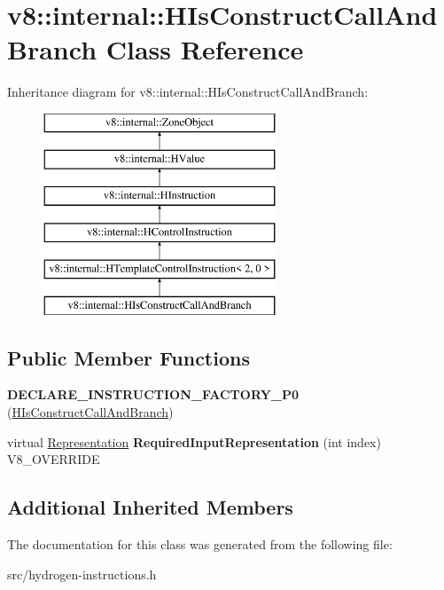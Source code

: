 \hypertarget{classv8_1_1internal_1_1_h_is_construct_call_and_branch}{}\section{v8\+:\+:internal\+:\+:H\+Is\+Construct\+Call\+And\+Branch Class Reference}
\label{classv8_1_1internal_1_1_h_is_construct_call_and_branch}
Inheritance diagram for v8\+:\+:internal\+:\+:H\+Is\+Construct\+Call\+And\+Branch\+:\begin{figure}[H]
\begin{center}
\leavevmode
\includegraphics[height=6.000000cm]{classv8_1_1internal_1_1_h_is_construct_call_and_branch}
\end{center}
\end{figure}
\subsection*{Public Member Functions}
\begin{DoxyCompactItemize}
\item 
\hypertarget{classv8_1_1internal_1_1_h_is_construct_call_and_branch_aeeb16aba89e0bfc5cfa10a5fbc4d72e8}{}{\bfseries D\+E\+C\+L\+A\+R\+E\+\_\+\+I\+N\+S\+T\+R\+U\+C\+T\+I\+O\+N\+\_\+\+F\+A\+C\+T\+O\+R\+Y\+\_\+\+P0} (\hyperlink{classv8_1_1internal_1_1_h_is_construct_call_and_branch}{H\+Is\+Construct\+Call\+And\+Branch})\label{classv8_1_1internal_1_1_h_is_construct_call_and_branch_aeeb16aba89e0bfc5cfa10a5fbc4d72e8}

\item 
\hypertarget{classv8_1_1internal_1_1_h_is_construct_call_and_branch_a961881423a9518264887da7873052a28}{}virtual \hyperlink{classv8_1_1internal_1_1_representation}{Representation} {\bfseries Required\+Input\+Representation} (int index) V8\+\_\+\+O\+V\+E\+R\+R\+I\+D\+E\label{classv8_1_1internal_1_1_h_is_construct_call_and_branch_a961881423a9518264887da7873052a28}

\end{DoxyCompactItemize}
\subsection*{Additional Inherited Members}


The documentation for this class was generated from the following file\+:\begin{DoxyCompactItemize}
\item 
src/hydrogen-\/instructions.\+h\end{DoxyCompactItemize}
